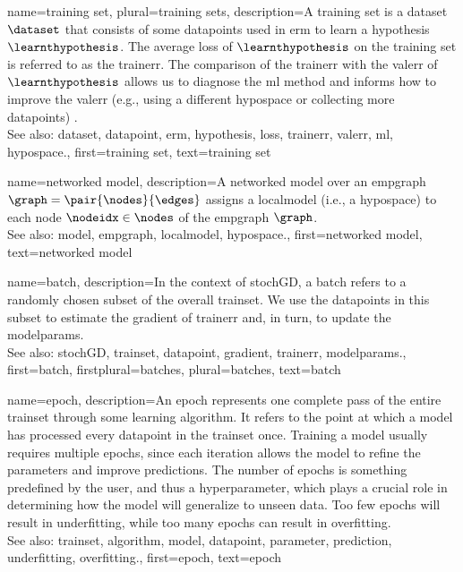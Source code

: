 {name={training set}, plural={training sets},
	description={A training set is a \gls{dataset} $\dataset$ that consists of some \glspl{datapoint} used in \gls{erm} 
		to learn a \gls{hypothesis} $\learnthypothesis$. The average \gls{loss} of $\learnthypothesis$ on the 
		training set is referred to as the \gls{trainerr}. The comparison of the \gls{trainerr} with the 
		\gls{valerr} of $\learnthypothesis$ allows us to diagnose the \gls{ml} method and informs how to improve 
		the \gls{valerr} (e.g., using a different \gls{hypospace} or collecting more \glspl{datapoint}) \cite[Sec. 6.6]{MLBasics}.
			\\
		See also: \gls{dataset}, \gls{datapoint}, \gls{erm}, \gls{hypothesis}, \gls{loss}, \gls{trainerr}, \gls{valerr}, \gls{ml}, \gls{hypospace}.},
	first={training set},
	text={training set}  
}

{name={networked model},
 	description={A networked \gls{model} over an \gls{empgraph} $\graph = \pair{\nodes}{\edges}$ assigns 
   		a \gls{localmodel} (i.e., a \gls{hypospace}) to each node $\nodeidx \in \nodes$ of the \gls{empgraph} $\graph$.
   		\\
		See also: \gls{model}, \gls{empgraph}, \gls{localmodel}, \gls{hypospace}.}, 
   first={networked model},
   text={networked model}  
}

{name={batch},
	description={In the context of \gls{stochGD}, a batch refers to a randomly 
		chosen subset of the overall \gls{trainset}. We use the \glspl{datapoint} in this subset 
		to estimate the \gls{gradient} of \gls{trainerr} and, in turn, to update the \glspl{modelparam}.
			\\
		See also: \gls{stochGD}, \gls{trainset}, \gls{datapoint}, \gls{gradient}, \gls{trainerr}, \glspl{modelparam}.}, 
 	first={batch},
 	firstplural={batches}, 
 	plural={batches}, 
 	text={batch}  
}


{name={epoch},
	description={An epoch represents one complete pass of the entire \gls{trainset} through some learning 
		\gls{algorithm}. It refers to the point at which a \gls{model} has processed every \gls{datapoint} in the \gls{trainset} once. 
		Training a \gls{model} usually requires multiple epochs, since each iteration allows the \gls{model} to refine the 
		\glspl{parameter} and improve \glspl{prediction}. The number of epochs is something predefined by the user,  
		and thus a hyperparameter, which plays a crucial role in determining how the \gls{model} will generalize to unseen \gls{data}. 
		Too few epochs will result in \gls{underfitting}, while too many epochs can result in \gls{overfitting}.
		\\
		See also: \gls{trainset}, \gls{algorithm}, \gls{model}, \gls{datapoint}, \gls{parameter}, \gls{prediction}, \gls{underfitting}, \gls{overfitting}.},
	first={epoch},
	text={epoch}
} 


